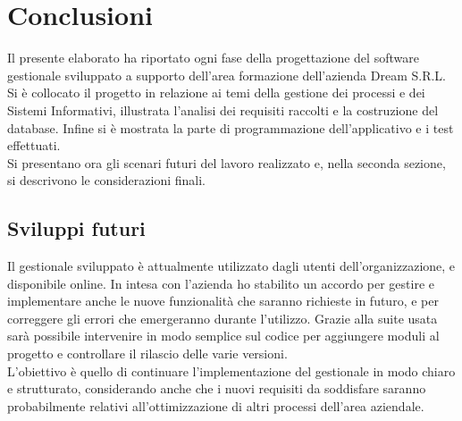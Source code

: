 \chapter{Conclusioni}
\label{cha:conclusioni}
Il presente elaborato ha riportato ogni fase della progettazione del software gestionale sviluppato a supporto dell'area formazione dell'azienda Dream S.R.L. Si è collocato il progetto in relazione ai temi della gestione dei processi e dei Sistemi Informativi, illustrata l'analisi dei requisiti raccolti e la costruzione del database. Infine si è mostrata la parte di programmazione dell'applicativo e i test effettuati.\\
\newline
Si presentano ora gli scenari futuri del lavoro realizzato e, nella seconda sezione, si descrivono le considerazioni finali. 

\section{Sviluppi futuri}
\label{sec:futuro}
Il gestionale sviluppato è attualmente utilizzato dagli utenti dell'organizzazione, e disponibile online. In intesa con l'azienda ho stabilito un accordo per gestire e implementare anche le nuove funzionalità che saranno richieste in futuro, e per correggere gli errori che emergeranno durante l'utilizzo. Grazie alla suite usata sarà possibile intervenire in modo semplice sul codice per aggiungere moduli al progetto e controllare il rilascio delle varie versioni.\\
\newline
L'obiettivo è quello di continuare l'implementazione del gestionale in modo chiaro e strutturato, considerando anche che i nuovi requisiti da soddisfare saranno probabilmente relativi all'ottimizzazione di altri processi dell'area aziendale.     

